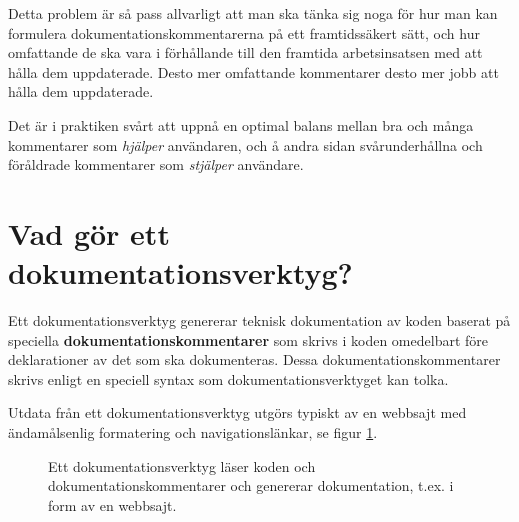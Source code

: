 Detta problem är så pass allvarligt att man ska tänka sig noga för hur man kan formulera  dokumentationskommentarerna på ett framtidssäkert sätt, och hur omfattande de ska vara i förhållande till den framtida arbetsinsatsen med att hålla dem uppdaterade. Desto mer omfattande kommentarer desto mer jobb att hålla dem uppdaterade.

Det är i praktiken svårt att uppnå en optimal balans mellan bra och många kommentarer som \textit{hjälper} användaren, och å andra sidan svårunderhållna och föråldrade kommentarer som \textit{stjälper} användare.


\section{Vad gör ett dokumentationsverktyg?}\label{appendix:buildtool}

Ett dokumentationsverktyg genererar teknisk dokumentation av koden baserat på speciella \textbf{dokumentationskommentarer} som skrivs i koden omedelbart före deklarationer av det som ska dokumenteras. Dessa dokumentationskommentarer skrivs enligt en speciell syntax som dokumentationsverktyget kan tolka.

Utdata från ett dokumentationsverktyg utgörs typiskt av en webbsajt med ändamålsenlig formatering och navigationslänkar, se figur \ref{fig:appendix:doctool}.

\begin{figure}[H]
\centering
{}
    \caption{Ett dokumentationsverktyg läser koden och dokumentationskommentarer och genererar dokumentation, t.ex. i form av en webbsajt.}
    \label{fig:appendix:doctool}
\end{figure}



